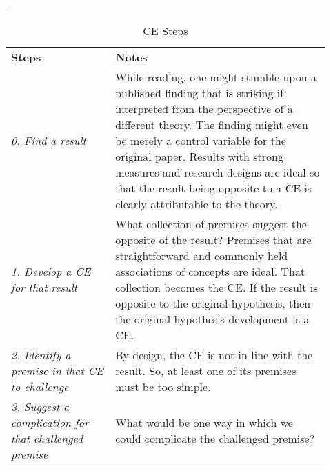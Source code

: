 \documentclass[twocolumn, 10pt]{article}
\newlength{\fullwidthlen}
\newenvironment{fullwidth}{%
  \begin{adjustwidth}{-\fullwidthlen}{}%
}{%
  \end{adjustwidth}%
}
\begin{document}
\begin{table}[t!]
  \begin{fullwidth}
    \caption{CE Steps}
    \label{tab:3}

    \begin{tabularx}{\columnwidth}{@{}>{\RaggedRight\arraybackslash}p{0.3\linewidth} >{\RaggedRight\arraybackslash}p{0.62\linewidth}@{}}

      \textbf{Steps}                                                               & \textbf{Notes}                                                                                                                                                                                                                                                                                    \\
      \emph{0. Find a result}                                                      & While reading, one might stumble upon a published finding that is striking if interpreted from the perspective of a different theory. The finding might even be merely a control variable for the original paper.
      \newline Results with strong measures and research designs are ideal so that the result being opposite to a CE is clearly attributable to the theory.                                                                                                                                                                                                                            \\
      \emph{1. Develop a CE for that result}                                       & What collection of premises suggest the opposite of the result? Premises that are  straightforward and commonly held  associations of concepts are ideal. That collection becomes the CE. If the result is opposite to the original hypothesis, then the original hypothesis development is a CE. \\
      \emph{2. Identify a premise in that CE to challenge}                         & By design, the CE is not in line with the result. So, at least one of its premises must be too simple.                                                                                                                                                                                            \\
      \emph{3. Suggest a complication for that challenged premise}                 & What would be one way in which we could complicate the challenged premise?                                                                                                                                                                                                                        \\

\end{tabularx}
\end{fullwidth}
\end{table}
\end{document}

